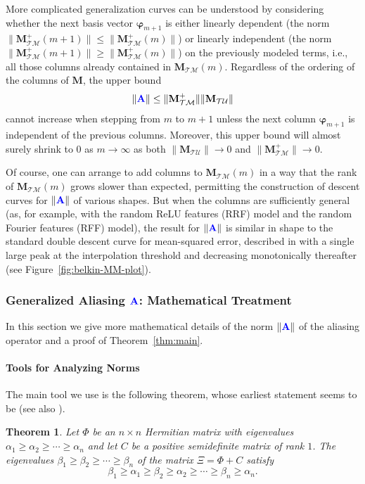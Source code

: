 \documentclass[twocolumn,aps,prx,superscriptaddress,10pt]{revtex4-2}
\newcommand{\0}{\bm{0}}
\newcommand{\bphi}{\boldsymbol{\varphi}}
\newcommand{\M}{\mathcal{M}} %
\newcommand{\T}{\mathcal{T}} %
\newcommand{\U}{\mathcal{U}} %
\newcommand{\bbA}{{\color{blue}{\mathbf{A}}}}  %
\newcommand{\bbM}{\mathbf{M}}
\newcommand{\MTM}{\bbM_{\T\M}}
\newcommand{\MTU}{\bbM_{\T\U}}
\newtheorem{theorem}{Theorem}[section]
\begin{document}
More complicated generalization curves can be understood by considering whether the next basis vector $\bphi_{m+1}$ is either linearly dependent (the norm $\|\MTM^+(m+1)\|\leq \|\MTM^+(m)\|$) or linearly independent (the norm $\|\MTM^+(m+1)\| \geq \|\MTM^+(m)\|$) on the previously modeled terms, i.e., all those columns already contained in $\MTM(m)$. Regardless of the ordering of the columns of $\bbM$, the upper bound
\[
\|\bbA\| \le \|\MTM^+\| \|\MTU\|
\]
cannot increase when stepping from $m$ to  $m+1$ unless the next column $\bphi_{m+1}$ is independent of the previous columns.  Moreover, this upper bound will almost surely shrink to $0$ as $m\to \infty$ as both $\|\MTU\| \rightarrow 0$ and $\|\MTM^+\|\rightarrow 0$.

Of course, one can arrange to add columns to $\MTM(m)$ in a way that the rank of $\MTM(m)$ grows slower than expected, permitting the construction of descent curves for $\|\bbA\|$ of various shapes.  But when the columns are sufficiently general (as, for example, with the random ReLU features (RRF) model and the random Fourier features (RFF) model), the result for $\|\bbA\|$ is similar in shape to the standard double descent curve for mean-squared error, described in \cite{BelkinOriginal} with a single large peak at the interpolation threshold and decreasing monotonically thereafter (see Figure~\ref{fig:belkin-MM-plot}). 
 
\subsubsection{Generalized Aliasing  \texorpdfstring{$\bbA$}{A}: Mathematical Treatment}\label{sec:math:A}

In this section we give more mathematical details of the norm $\|\bbA\|$ of the aliasing operator and a proof of Theorem~\ref{thm:main}.

\paragraph{Tools for Analyzing Norms}
The main tool we use is the following theorem, whose earliest statement seems to be \cite[Theorem 17]{Gantmacher} (see also \cite{BunchNielsen, Thompson, Wilkinson}).
\begin{theorem}\label{thm:interlaced-eigenvalues}
Let $\Phi$ be an $n\times n$ Hermitian matrix with eigenvalues $\alpha_1\ge \alpha_2 \ge \cdots \ge \alpha_n$ and let $C$ be a positive semidefinite matrix of rank $1$.  The eigenvalues  $\beta_1\ge \beta_2 \ge \cdots \ge \beta_n$ of the matrix $\Xi = \Phi + C$ satisfy 
\[
\beta_1 \ge \alpha_1 \ge \beta_2 \ge \alpha_2 \ge \cdots \ge \beta_n \ge \alpha_n.
\]
\end{theorem}
\end{document}
